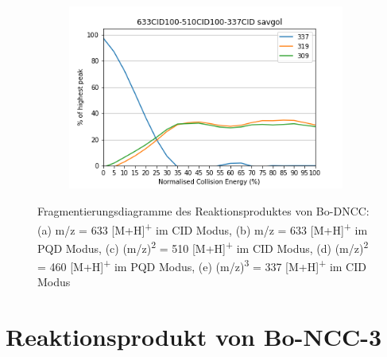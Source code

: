 \begin{figure}[!htbp]
  \begin{subfigure}[b]{0.5\textwidth}
    \includegraphics[width=\textwidth]{content/Anhang/ESIMS/RP_Bo-DNCC/633CID100-510CID100-337CID-337savgol.png}
    \caption{}
  \end{subfigure}
  
  \caption[Fragmentierungsdiagramme des Reaktionsproduktes von Bo-DNCC, Quelle: Autor]{Fragmentierungsdiagramme des Reaktionsproduktes von Bo-DNCC: (a) m/z = 633 [M+H]\textsuperscript{+} im CID Modus, (b) m/z = 633 [M+H]\textsuperscript{+} im PQD Modus, (c) (m/z)\textsuperscript{2} = 510 [M+H]\textsuperscript{+} im CID Modus, (d) (m/z)\textsuperscript{2} = 460 [M+H]\textsuperscript{+} im PQD Modus, (e) (m/z)\textsuperscript{3} = 337 [M+H]\textsuperscript{+} im CID Modus}
\end{figure}

\pagebreak
\section{Reaktionsprodukt von Bo-NCC-3}

